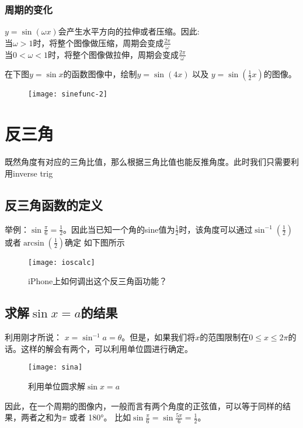 \subsubsection*{周期的变化}
$y=\sin(\omega x)$会产生水平方向的拉伸或者压缩。因此:\\
当$\omega>1$时，将整个图像做压缩，周期会变成$\frac{2\pi}{\omega}$\\
当$0<\omega<1$时，将整个图像做拉伸，周期会变成$\frac{2\pi}{\omega}$\\

\begin{TaskBox}
在下图$y=\sin x$的函数图像中，绘制$y=\sin (4x)$ 以及 $y=\sin (\frac{1}{2}x)$的图像。
\begin{figure}[H]
\centering
\texttt{[image: sinefunc-2]}
\end{figure}
\end{TaskBox}
\clearpage

\section{反三角}
\label{sec:Inverse Trig}
既然角度有对应的三角比值，那么根据三角比值也能反推角度。此时我们只需要利用\gls{inverse trig}

\subsection*{反三角函数的定义}
举例：$\sin \frac{\pi}{6}= \frac{1}{2}$。因此当已知一个角的sine值为$\frac{1}{2}$时，该角度可以通过$\sin^{-1} (\frac{1}{2})$或者$\arcsin \left( \frac{1}{2}\right)$确定
如下图所示
\begin{figure}[H]
\centering
\texttt{[image: ioscalc]}
\caption{iPhone上如何调出这个反三角函功能？}
\end{figure}

\subsection*{求解$\sin x=a$的结果}
利用刚才所说：
$x=\sin^{-1} a=\theta$。但是，如果我们将$x$的范围限制在$0\le x\le 2\pi$的话。这样的解会有两个，可以利用单位圆进行确定。
\begin{figure}[H]
\centering
\texttt{[image: sina]}
\caption{利用单位圆求解$\sin x=a$}
\end{figure}

因此，在一个周期的图像内，一般而言有两个角度的正弦值，可以等于同样的结果，两者之和为$\pi$ 或者 180\si{\degree}。 比如$\sin \frac{\pi}{6}=\sin \frac{5\pi}{6}=\frac{1}{2}$。


